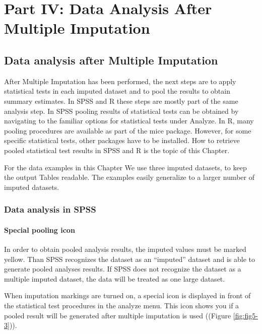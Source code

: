 \documentclass[
]{book}
\begin{document}
\hypertarget{part-part-iv-data-analysis-after-multiple-imputation}{%
\part{Part IV: Data Analysis After Multiple Imputation}\label{part-part-iv-data-analysis-after-multiple-imputation}}

\hypertarget{data-analysis-after-multiple-imputation}{%
\chapter{Data analysis after Multiple Imputation}\label{data-analysis-after-multiple-imputation}}

After Multiple Imputation has been performed, the next steps are to apply statistical tests in each imputed dataset and to pool the results to obtain summary estimates. In SPSS and R these steps are mostly part of the same analysis step. In SPSS pooling results of statistical tests can be obtained by navigating to the familiar options for statistical tests under Analyze. In R, many pooling procedures are available as part of the mice package. However, for some specific statistical tests, other packages have to be installed. How to retrieve pooled statistical test results in SPSS and R is the topic of this Chapter.

For the data examples in this Chapter We use three imputed datasets, to keep the output Tables readable. The examples easily generalize to a larger number of imputed datasets.

\hypertarget{data-analysis-in-spss}{%
\section{Data analysis in SPSS}\label{data-analysis-in-spss}}

\hypertarget{special-pooling-icon}{%
\subsection{Special pooling icon}\label{special-pooling-icon}}

In order to obtain pooled analysis results, the imputed values must be marked yellow. Than SPSS recognizes the dataset as an ``imputed'' dataset and is able to generate pooled analyses results. If SPSS does not recognize the dataset as a multiple imputed dataset, the data will be treated as one large dataset.

When imputation markings are turned on, a special icon is displayed in front of the statistical test procedures in the analyze menu. This icon shows you if a pooled result will be generated after multiple imputation is used ((Figure \ref{fig:fig5-3})).
\end{document}
